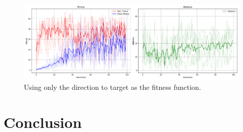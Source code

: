 \documentclass[sigconf]{acmart}
\begin{document}
\begin{figure}[t]
  \centering
  \includegraphics[width=0.95\linewidth]{imgs/result_Run_cx0.85_mut0.25_2024_1214_0636_dir_only.png}
  \caption{Using only the direction to target as the fitness function.}
  \label{fig:plot_dir}
\end{figure}
\section{Conclusion}



\end{document}
